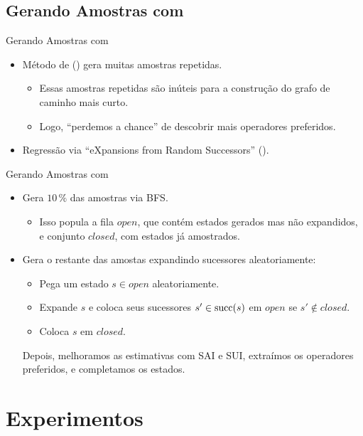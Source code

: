 \documentclass{beamer}
\begin{document}
\subsection{Gerando Amostras com \bfsrs}
\begin{frame}{Gerando Amostras com \bfsrs}
\begin{itemize}
  \item Método de \cite{Bettker.etal/2022} (\bfsrw) gera muitas \alert{amostras repetidas}.
  \begin{itemize}
    \item Essas amostras repetidas são inúteis para a construção do grafo de caminho mais curto.
    \item Logo, ``perdemos a chance'' de descobrir mais operadores preferidos.
  \end{itemize}
  \pause
  \item Regressão via ``\alert{eXpansions from Random Successors}'' (\alert{\bfsrs}).
\end{itemize}
\end{frame}

\begin{frame}{Gerando Amostras com \bfsrs}
\begin{itemize}
  \item Gera $10\,\%$ das amostras via \alert{BFS}.
  \begin{itemize}
    \item Isso popula a fila \alert{$open$}, que contém estados gerados mas não expandidos, e conjunto \alert{$closed$}, com estados já amostrados.
  \end{itemize}
  \pause
  \item Gera o restante das amostas \alert{expandindo sucessores aleatoriamente}:
  \begin{itemize}
    \item Pega um estado $s \in open$ aleatoriamente.
    \pause
    \item Expande $s$ e coloca seus sucessores $s' \in \operatorname{succ}(s)$ em $open$ se $s' \notin closed$.
    \pause
    \item Coloca $s$ em $closed$.
  \end{itemize}
\pause
\vspace{1.0cm}
Depois, melhoramos as estimativas com SAI e SUI, extraímos os operadores preferidos, e completamos os estados.
\end{itemize}
\end{frame}


\section{Experimentos}
\end{document}
